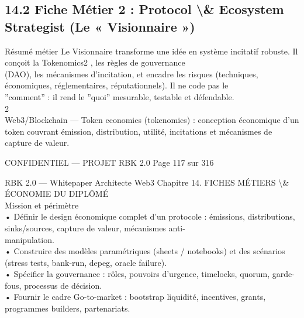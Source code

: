 \documentclass[12pt,landscape,a4paper]{article}
\newenvironment{confidential}
{\begin{tcolorbox}[
    colback=rbkred!5!white,
    colframe=rbkred!75!black,
    title=CONFIDENTIEL,
    fonttitle=\bfseries\color{white},
    coltitle=rbkred!75!black,
    breakable,
    enhanced,
    frame hidden,
    borderline west={2pt}{0pt}{rbkred!75!black}
]}
{\end{tcolorbox}}
\begin{document}
\subsection{14.2 Fiche Métier 2 : Protocol \textbackslash{}& Ecosystem Strategist (Le « Visionnaire »)}
Résumé métier Le Visionnaire transforme une idée en système incitatif robuste. Il conçoit la Tokenomics2 , les règles de gouvernance\\
(DAO), les mécanismes d’incitation, et encadre les risques (techniques, économiques, réglementaires, réputationnels). Il ne code pas le\\
”comment” : il rend le ”quoi” mesurable, testable et défendable.\\
2\\
Web3/Blockchain — Token economics (tokenomics) : conception économique d’un token couvrant émission, distribution, utilité, incitations et mécanismes de\\
capture de valeur.\\
\vspace{0.5em}
\vspace{0.5em}
\vspace{0.5em}
\vspace{0.5em}
\begin{confidential}CONFIDENTIEL — PROJET RBK 2.0                                       Page 117 sur 316\end{confidential}
RBK 2.0 — Whitepaper Architecte Web3                                              Chapitre 14. FICHES MÉTIERS \textbackslash{}& ÉCONOMIE DU DIPLÔMÉ\\
\vspace{0.5em}
\vspace{0.5em}
Mission et périmètre\\
\vspace{0.5em}
• Définir le design économique complet d’un protocole : émissions, distributions, sinks/sources, capture de valeur, mécanismes anti-\\
manipulation.\\
\vspace{0.5em}
• Construire des modèles paramétriques (sheets / notebooks) et des scénarios (stress tests, bank-run, depeg, oracle failure).\\
\vspace{0.5em}
• Spécifier la gouvernance : rôles, pouvoirs d’urgence, timelocks, quorum, garde-fous, processus de décision.\\
\vspace{0.5em}
• Fournir le cadre Go-to-market : bootstrap liquidité, incentives, grants, programmes builders, partenariats.\\
\end{document}
